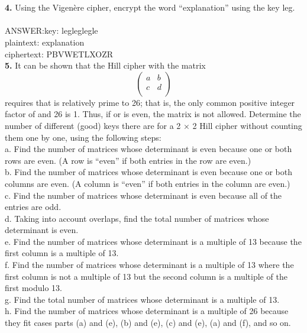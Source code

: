\documentclass[paper=a4, fontsize=11pt]{scrartcl} %
\numberwithin{equation}{section} %
\numberwithin{figure}{section} %
\numberwithin{table}{section} %
\begin{document}
\\
\\
\textbf{4.} Using the Vigenère cipher, encrypt the word “explanation” using the key leg.\\
\\
ANSWER:key:     legleglegle\\
    plaintext:  explanation\\
        ciphertext:     PBVWETLXOZR\\
\textbf{5.} It can be shown that the Hill cipher with the matrix
\begin{equation}       %
\left(                 %
  \begin{array}{cc}   %
    a & b\\  %
    c & d\\  %
  \end{array}
\right)                 %
\end{equation}
requires that is relatively prime to 26; that is, the only common positive integer factor of and 26 is 1. Thus, if or is even, the matrix is not allowed. Determine the number of different (good) keys there are for a 2 × 2 Hill cipher without counting them one by one, using the following steps:\\
a. Find the number of matrices whose determinant is even because one or both rows are even. (A row is “even” if both entries in the row are even.)\\
b. Find the number of matrices whose determinant is even because one or both columns are even. (A column is “even” if both entries in the column are even.)\\
c. Find the number of matrices whose determinant is even because all of the entries are odd.\\
d. Taking into account overlaps, find the total number of matrices whose determinant is even.\\
e. Find the number of matrices whose determinant is a multiple of 13 because the first column is a multiple of 13.\\
f. Find the number of matrices whose determinant is a multiple of 13 where the first column is not a multiple of 13 but the second column is a multiple of the first modulo 13.\\
g. Find the total number of matrices whose determinant is a multiple of 13.\\
h. Find the number of matrices whose determinant is a multiple of 26 because they fit cases parts (a) and (e), (b) and (e), (c) and (e), (a) and (f), and so on.\\
\end{document}
